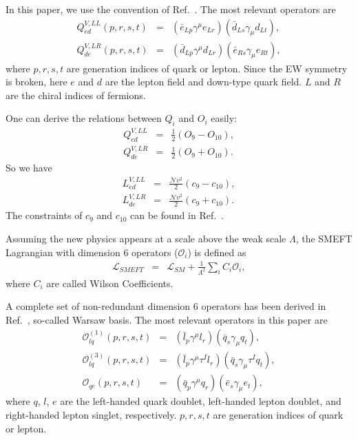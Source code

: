 \documentclass[a4paper,11pt]{article}
\begin{document}
In this paper, we use the convention of Ref.~\cite{Jenkins:2017jig}. 
The most relevant operators are 
\begin{eqnarray}
  Q^{V,LL}_{ed}(p,r,s,t) &=& (\bar{e}_{Lp}\gamma^\mu e_{Lr})(\bar{d}_{Ls}\gamma_\mu d_{Lt}),  \label{QVLLed} \\
  Q^{V,LR}_{de}(p,r,s,t) &=& (\bar{d}_{Lp}\gamma^\mu d_{Lr})(\bar{e}_{Rs}\gamma_\mu e_{Rt}),  \label{QVLRde}
\end{eqnarray}
where $p,r,s,t$ are generation indices of quark or lepton. 
Since the EW symmetry is broken, here $e$ and $d$ are the lepton field and down-type quark field. 
$L$ and $R$ are the chiral indices of fermions. 

One can derive the relations between $Q_i$ and $O_i$ easily:
\begin{eqnarray}
  Q^{V,LL}_{ed} &=& \frac{1}{2}\left(O_9-O_{10}\right),  \\
  Q^{V,LR}_{de} &=& \frac{1}{2}\left(O_9+O_{10}\right).   
\end{eqnarray}
So we have 
\begin{eqnarray}
  L^{V,LL}_{ed} &=& \frac{\mathcal{N}v^2}{2}(c_9-c_{10}),  \\
  L^{V,LR}_{de} &=& \frac{\mathcal{N}v^2}{2}(c_9+c_{10}). 
\end{eqnarray}
The constraints of $c_9$ and $c_{10}$ can be found in Ref.~\cite{Altmannshofer:2021qrr}.

Assuming the new physics appears at a scale above the weak scale $\Lambda$, 
the SMEFT Lagrangian with dimension 6 operators ($\mathcal{O}_i$) is defined as
\begin{eqnarray}
  \mathcal{L}_{SMEFT} &=& \mathcal{L}_{SM} + \frac{1}{\Lambda^2}\sum_{i}C_i\mathcal{O}_i,  
\end{eqnarray}
where $C_i$ are called Wilson Coefficients.

A complete set of non-redundant dimension 6 operators has been derived in Ref.~\cite{Grzadkowski:2010es}, so-called Warsaw basis. 
The most relevant operators in this paper are
\begin{eqnarray}
   \mathcal{O}^{(1)}_{lq}(p,r,s,t) &=& (\bar{l}_p\gamma^\mu l_r)(\bar{q}_s\gamma_\mu q_{t}),  \label{O1lq} \\ 
   \mathcal{O}^{(3)}_{lq}(p,r,s,t) &=& (\bar{l}_p\gamma^\mu\tau^I l_r)(\bar{q}_s\gamma_\mu\tau^I q_{t}),  \label{O3lq} \\ 
   \mathcal{O}_{qe}(p,r,s,t) &=& (\bar{q}_p\gamma^\mu q_r)(\bar{e}_s\gamma_\mu e_t), \label{Oqe}
\end{eqnarray}
where $q$, $l$, $e$ are the left-handed quark doublet, left-handed lepton doublet, and right-handed lepton singlet, respectively. 
$p,r,s,t$ are generation indices of quark or lepton.
\end{document}
